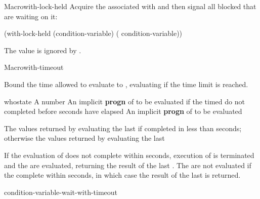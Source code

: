 \begin{functiondoc}{Macro}{with-lock-held}{\code{(} 
    \code{)}
    \superstar{} 
    \returns{} \superstar}
%
Acquire the  associated with  and then
signal all blocked  that are waiting on it:
\begin{example}
  (with-lock-held (condition-variable)
    ( condition-variable))
\end{example}

\fnnote The  value is ignored by
.

\end{functiondoc}


\begin{functiondoc}{Macro}{with-timeout}{\code{(} 
    \superstar{}\code{)}
    \superstar{} 
    \returns{} \superstar}
\fnsyntax

\fnpurpose Bound the time allowed to evaluate  to
, evaluating  if the time limit is reached.

\fnpackage {}

\fnmodule {}

\fnargs
\begin{args}{whostate}
\arg[seconds] A number
 An implicit \textbf{progn} of  to be
evaluated if the timed  do not completed before 
seconds have elapsed
\arg[forms] An implicit \textbf{progn} of  to be evaluated
\end{args}

\fnreturns The values returned by evaluating the last  if
completed in less than  seconds; otherwise the values returned by
evaluating the last 

\fnerrors
\nothreads{}

\fndescription If the evaluation of  does not complete within
 seconds, execution of  is terminated and the
 are evaluated, returning the result of the last
. The  are not evaluated if the
 complete within  seconds, in which case the result of the
last  is returned.

\begin{alsos}{condition-variable-wait-with-timeout}
\end{alsos}


\end{functiondoc}
